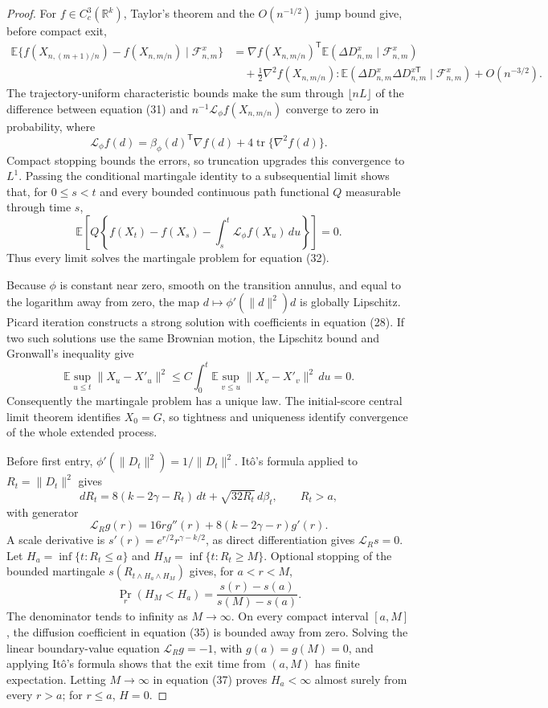 \documentclass{article}
\begin{document}
\begin{proof}
For \(f\in C_c^3(\mathbb R^k)\), Taylor's theorem and the \(O(n^{-1/2})\) jump bound give, before compact exit,
\[
 \begin{split}
 \mathbb E\{f(X_{n,(m+1)/n})-f(X_{n,m/n})\mid\mathcal F^x_{n,m}\}
 &=\nabla f(X_{n,m/n})^{\mathsf T}
   \mathbb E(\Delta D^x_{n,m}\mid\mathcal F^x_{n,m})\\
 &\quad+\frac12\nabla^2f(X_{n,m/n}):
 \mathbb E(\Delta D^x_{n,m}\Delta D^{x\mathsf T}_{n,m}
 \mid\mathcal F^x_{n,m})+O(n^{-3/2}). \tag{31}
 \end{split}
\]
The trajectory-uniform characteristic bounds make the sum through \(\lfloor nL\rfloor\) of the difference between equation (31) and
\(n^{-1}\mathcal L_\phi f(X_{n,m/n})\) converge to zero in probability, where
\[
 \mathcal L_\phi f(d)
 =\beta_\phi(d)^{\mathsf T}\nabla f(d)
  +4\operatorname{tr}\{\nabla^2f(d)\}. \tag{32}
\]
Compact stopping bounds the errors, so truncation upgrades this convergence to \(L^1\). Passing the conditional martingale identity to a subsequential limit shows that, for \(0\le s<t\) and every bounded continuous path functional \(Q\) measurable through time \(s\),
\[
 \mathbb E\!\left[
 Q\left\{f(X_t)-f(X_s)-\int_s^t\mathcal L_\phi f(X_u)\,du\right\}
 \right]=0. \tag{33}
\]
Thus every limit solves the martingale problem for equation (32).

Because \(\phi\) is constant near zero, smooth on the transition annulus, and equal to the logarithm away from zero, the map
\(d\mapsto\phi'(\|d\|^2)d\) is globally Lipschitz. Picard iteration constructs a strong solution with coefficients in equation (28). If two such solutions use the same Brownian motion, the Lipschitz bound and Gronwall's inequality give
\[
 \mathbb E\sup_{u\le t}\|X_u-X'_u\|^2
 \le C\int_0^t\mathbb E\sup_{v\le u}\|X_v-X'_v\|^2\,du=0. \tag{34}
\]
Consequently the martingale problem has a unique law. The initial-score central limit theorem identifies \(X_0=G\), so tightness and uniqueness identify convergence of the whole extended process.

Before first entry, \(\phi'(\|D_t\|^2)=1/\|D_t\|^2\). It\^o's formula applied to \(R_t=\|D_t\|^2\) gives
\[
 dR_t=8(k-2\gamma-R_t)\,dt+\sqrt{32R_t}\,d\beta_t,
 \qquad R_t>a, \tag{35}
\]
with generator
\[
 \mathcal L_Rg(r)=16r g''(r)+8(k-2\gamma-r)g'(r). \tag{36}
\]
A scale derivative is \(s'(r)=e^{r/2}r^{\gamma-k/2}\), as direct differentiation gives \(\mathcal L_Rs=0\). Let
\(H_a=\inf\{t:R_t\le a\}\) and \(H_M=\inf\{t:R_t\ge M\}\). Optional stopping of the bounded martingale
\(s(R_{t\wedge H_a\wedge H_M})\) gives, for \(a<r<M\),
\[
 \Pr_r(H_M<H_a)=\frac{s(r)-s(a)}{s(M)-s(a)}. \tag{37}
\]
The denominator tends to infinity as \(M\to\infty\). On every compact interval \([a,M]\), the diffusion coefficient in equation (35) is bounded away from zero. Solving the linear boundary-value equation
\(\mathcal L_Rg=-1\), with \(g(a)=g(M)=0\), and applying It\^o's formula shows that the exit time from \((a,M)\) has finite expectation. Letting \(M\to\infty\) in equation (37) proves \(H_a<\infty\) almost surely from every \(r>a\); for \(r\le a\), \(H=0\).


\end{proof}
\end{document}

